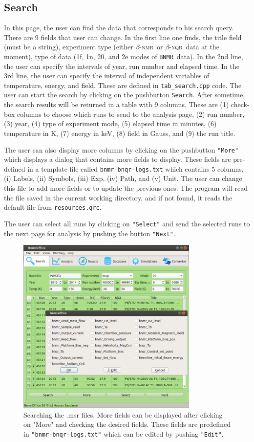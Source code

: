 \documentclass[10pt,letterpaper,oneside]{article}
\newcommand{\bnmr}{$\beta$-\textsc{nmr}}
\newcommand{\bnmrg}{\texttt{BNMR}}
\newcommand{\bnqr}{$\beta$-\textsc{nqr}}
\begin{document}
\subsection{Search}
In this page, the user can find the data that corresponds to his search query. There are 9 fields that user can change. In the first line one finds, the title field (must be a string), experiment type (either \bnmr\ or \bnqr\ data at the moment), type of data (1f, 1n, 20, and 2e modes of \bnmrg\ data). In the 2nd line, the user can specify 
the intervals of year, run number and elapsed time. In the 3rd line, 
the user can specify the interval of independent variables of temperature, energy, and field. These are defined in \verb+tab_search.cpp+ code.
The user can start the search by clicking on the pushbutton \verb+Search+.
After sometime, the search results will be returned in a table with 9 columns. These are (1) check-box columns to choose which runs to send to the analysis page, (2) run number, (3) year, (4) type of experiment mode, (5) elapsed time in minutes, (6) temperature in K, (7) energy in keV, (8) field in Gauss, and (9) the run title. 

The user can also display more columns by clicking on the pushbutton \verb+"More"+ which displays a dialog that contains more fields to display. These fields are pre-defined in a template file called \verb+bnmr-bnqr-logs.txt+ which contains 5 columns, (i) Labels, (ii) Symbols, (iii) Exp, (iv) Path, and (v) Unit. The user can change this file to add more fields or to update the previous ones. The program will read the file saved in the current working directory, and if not found, it reads the default file from \verb+resources.qrc+.

The user can select all runs by clicking on \verb+"Select"+ and send the selected runs to the next page for analysis by pushing the button \verb+"Next"+.
\begin{figure}[h]
\center
\includegraphics[width=0.8\textwidth]{search.png}
 \caption{Searching the .msr files. More fields can be displayed after clicking on "More" and checking the desired fields. These fields are predefined in \texttt{"bnmr-bnqr-logs.txt"} which can be edited by pushing \texttt{"Edit"}.}
 \label{fig-mag}
 \end{figure}
\end{document}
